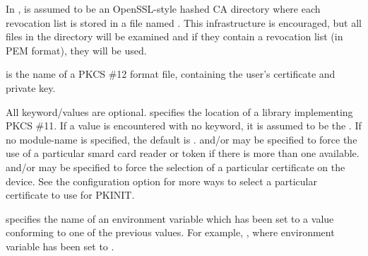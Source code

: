 \documentclass[letterpaper,10pt,english]{sphinxmanual}
\begin{document}
\begin{description}
In ,  is assumed to be an OpenSSL-style
hashed CA directory where each revocation list is stored in a file
named .  This infrastructure is encouraged,
but all files in the directory will be examined and if they
contain a revocation list (in PEM format), they will be used.

\item[{\sphinxstylestrong{PKCS12:}\sphinxstyleemphasis{filename}}] \leavevmode
{} is the name of a PKCS \#12 format file, containing the
user’s certificate and private key.

\item[{\sphinxstylestrong{PKCS11:}{[}\sphinxstylestrong{module\_name=}{]}\sphinxstyleemphasis{modname}{[}\sphinxstylestrong{:slotid=}\sphinxstyleemphasis{slot-id}{]}{[}\sphinxstylestrong{:token=}\sphinxstyleemphasis{token-label}{]}{[}\sphinxstylestrong{:certid=}\sphinxstyleemphasis{cert-id}{]}{[}\sphinxstylestrong{:certlabel=}\sphinxstyleemphasis{cert-label}{]}}] \leavevmode
All keyword/values are optional.   specifies the location
of a library implementing PKCS \#11.  If a value is encountered
with no keyword, it is assumed to be the .  If no
module-name is specified, the default is {\hyperref[\detokenize{mitK5defaults:paths}]{}}.
 and/or  may be specified to force the use of
a particular smard card reader or token if there is more than one
available.   and/or  may be specified to
force the selection of a particular certificate on the device.
See the  configuration option for more ways
to select a particular certificate to use for PKINIT.

\item[{\sphinxstylestrong{ENV:}\sphinxstyleemphasis{envvar}}] \leavevmode
{} specifies the name of an environment variable which has
been set to a value conforming to one of the previous values.  For
example, , where environment variable
 has been set to .

\end{description}
\end{document}
